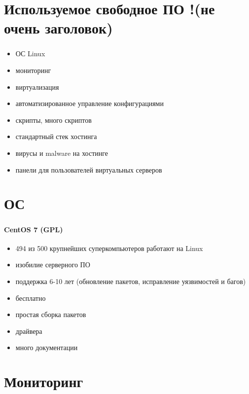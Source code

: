 
\section{Используемое свободное ПО !(не очень заголовок)}

\begin{frame}
\frametitle{\insertsection}
\begin{itemize}
	\item ОС Linux
	\item мониторинг
	\item виртуализация
	\item автоматизированное управление конфигурациями
	\item скрипты, много скриптов
	\item стандартный стек хостинга
	\item вирусы и malware на хостинге
	\item панели для пользователей виртуальных серверов
\end{itemize}
\end{frame}


\section{ОС}

\begin{frame}
\frametitle{\insertsection}
\framesubtitle{CentOS 7 (GPL)}
\begin{itemize}
	\item 494 из 500 крупнейших суперкомпьютеров работают на Linux
	\item изобилие серверного ПО
	\item поддержка 6-10 лет (обновление пакетов, исправление уязвимостей и багов)
	\item бесплатно
	\item простая сборка пакетов
	\item драйвера
	\item много документации
\end{itemize}
\end{frame}


\section{Мониторинг}

